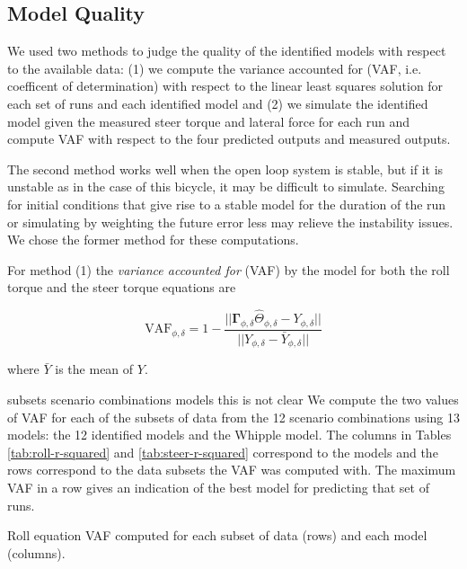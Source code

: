 \documentclass[a4paper]{article}
\begin{document}
\subsection*{Model Quality}

We used two methods to judge the quality of the identified models with respect
to the available data: (1) we compute the variance accounted for (VAF, i.e.
coefficent of determination) with respect to the linear least squares solution
for each set of runs and each identified model and (2) we simulate the
identified model given the measured steer torque and lateral force for each run
and compute VAF with respect to the four predicted outputs and measured
outputs.

The second method works well when the open loop system is stable, but if it is
unstable as in the case of this bicycle, it may be difficult to simulate.
Searching for initial conditions that give rise to a stable model for the
duration of the run or simulating by weighting the future error less may
relieve the instability issues. We chose the former method for these
computations.

For method (1) the \emph{variance accounted for} (VAF) by the model for both
the roll torque and the steer torque equations are

\begin{equation}
  \label{eq:vaf}
  \textrm{VAF}_{\phi,\delta} = 1 - \frac{\vert \vert
    \mathbf{\Gamma}_{\phi,\delta}\hat{\Theta}_{\phi,\delta} - Y_{\phi,\delta} \vert \vert}
                            {\vert \vert Y_{\phi,\delta} - \bar{Y}_{\phi,\delta} \vert \vert}
\end{equation}

where $\bar{Y}$ is the mean of $Y$.

subsets scenario  combinations  models   this is not clear
We compute the two values of VAF for each of the subsets of data from the 12
scenario combinations using 13 models: the 12 identified models and the Whipple
model. The columns in Tables \ref{tab:roll-r-squared} and
\ref{tab:steer-r-squared} correspond to the models and the rows correspond to
the data subsets the VAF was computed with. The maximum VAF in a row gives an
indication of the best model for predicting that set of runs.

\begin{table}
  \centering
  \caption{Roll equation VAF computed for each subset of data (rows)
    and each model (columns).}
  \tiny
  
  \label{tab:roll-r-squared}
\end{table}
\end{document}
